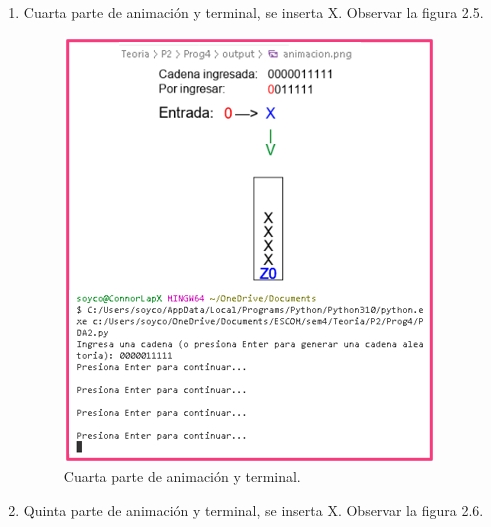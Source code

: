\begin{enumerate}
\newpage
\item Cuarta parte de animación y terminal, se inserta X. Observar la figura 2.5.

\begin{figure}[h]
    \begin{center}
    \includegraphics[width=0.7\linewidth]{Images/Cap5.png}
    \end{center}
\caption{Cuarta parte de animación y terminal.}
\label{fig:imagen}
\end{figure}

\newpage
\item Quinta parte de animación y terminal, se inserta X. Observar la figura 2.6.


\end{enumerate}
